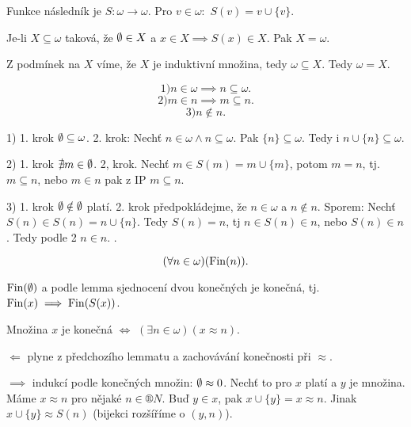 \documentclass[12pt]{article}                   %
\begin{document}
    \begin{definice}[Následník]
        Funkce následník je $S: \omega \rightarrow \omega$. Pro $v \in \omega:$ $S(v) = v \cup \{v\}$.
    \end{definice}

    \begin{veta}
        Je-li $X \subseteq \omega$ taková, že $\emptyset \in X$ a $x \in X \implies S(x) \in X$. Pak $X = \omega$.

        \begin{dukazin}
            Z podmínek na $X$ víme, že $X$ je induktivní množina, tedy $\omega \subseteq X$. Tedy $\omega = X$.
        \end{dukazin}
    \end{veta}

    \begin{lemma}
        $$ 1) n \in \omega \implies n \subseteq \omega. $$
        $$ 2) m \in n \implies m \subseteq n. $$
        $$ 3) n \notin n. $$

        \begin{dukazin}[Indukcí]
            1) 1. krok $\emptyset \subseteq \omega$. 2. krok: Nechť $n \in \omega \land n \subseteq \omega$. Pak $\{n\} \subseteq \omega$. Tedy i $n \cup \{n\} \subseteq \omega$.

            2) 1. krok $\nexists m \in \emptyset$. 2, krok. Nechť $m \in S(m) = m \cup \{m\}$, potom $m = n$, tj. $m \subseteq n$, nebo $m \in n$ pak z IP $m \subseteq n$.

            3) 1. krok $\emptyset \notin \emptyset$ platí. 2. krok předpokládejme, že $n \in \omega$ a $n \notin n$. Sporem: Nechť $S(n) \in S(n) = n \cup \{n\}$. Tedy $S(n) = n$, tj $n \in S(n) \in n$, nebo $S(n) \in n$. Tedy podle 2 $n \in n$. \lightning.
        \end{dukazin}
    \end{lemma}

    \begin{lemma}
        $$ (\forall n \in \omega)(\operatorname{Fin}(n)). $$

        \begin{dukazin}
            $\operatorname{Fin}(\emptyset)$ a podle lemma sjednocení dvou konečných je konečná, tj. $\operatorname{Fin}(x) \implies \operatorname{Fin}(S(x))$.
        \end{dukazin}

        \begin{veta}
            Množina $x$ je konečná $\Leftrightarrow$ $(\exists n \in \omega)(x \approx n)$.

            \begin{dukazin}
                $\Leftarrow$ plyne z předchozího lemmatu a zachovávání konečnosti při $\approx$.

                $\implies$ indukcí podle konečných množin: $\emptyset \approx 0$. Nechť to pro $x$ platí a $y$ je množina. Máme $x \approx n$ pro nějaké $n \in ®N$. Buď $y \in x$, pak $x \cup \{y\} = x \approx n$. Jinak $x \cup \{y\} \approx S(n)$ (bijekci rozšíříme o $(y, n)$).
            \end{dukazin}
        \end{veta}
    \end{lemma}
\end{document}
